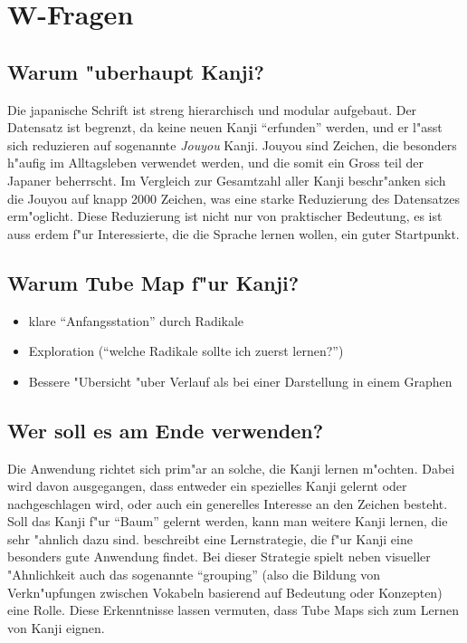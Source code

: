 \section{W-Fragen}
\subsection{Warum "uberhaupt Kanji?}
Die japanische Schrift ist streng hierarchisch und modular aufgebaut. Der Datensatz ist begrenzt, da keine neuen Kanji "`erfunden"' werden, und er l"asst sich reduzieren auf sogenannte \emph{Jouyou} Kanji. Jouyou sind Zeichen, die besonders h"aufig im Alltagsleben verwendet werden, und die somit ein Gross teil der Japaner beherrscht. Im Vergleich zur Gesamtzahl aller Kanji beschr"anken sich die Jouyou auf knapp 2000 Zeichen, was eine starke Reduzierung des Datensatzes erm"oglicht.
Diese Reduzierung ist nicht nur von praktischer Bedeutung, es ist auss erdem f"ur Interessierte, die die Sprache lernen wollen, ein guter Startpunkt. 

\subsection{Warum Tube Map f"ur Kanji?}
\begin{itemize}
\item klare "`Anfangsstation"' durch Radikale
\item Exploration ("`welche Radikale sollte ich zuerst lernen?"')
\item Bessere "Ubersicht "uber Verlauf als bei einer Darstellung in einem Graphen
\end{itemize}

\subsection{Wer soll es am Ende verwenden?}
Die Anwendung richtet sich prim"ar an solche, die Kanji lernen m"ochten. Dabei wird davon ausgegangen, dass entweder ein spezielles Kanji gelernt oder nachgeschlagen wird, oder auch ein generelles Interesse an den Zeichen besteht. Soll das Kanji f"ur "`Baum"' gelernt werden, kann man weitere Kanji lernen, die sehr "ahnlich dazu sind. 
\cite{kanjilearningjapanese10} beschreibt eine Lernstrategie, die f"ur Kanji eine besonders gute Anwendung findet. Bei dieser Strategie spielt neben visueller "Ahnlichkeit auch das sogenannte "`grouping"' (also die Bildung von Verkn"upfungen zwischen Vokabeln basierend auf Bedeutung oder Konzepten) eine Rolle. 
Diese Erkenntnisse lassen vermuten, dass Tube Maps sich zum Lernen von Kanji eignen.
